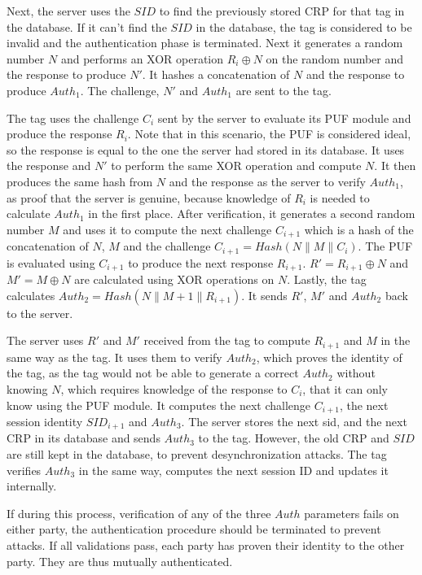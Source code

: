 Next, the server uses the $SID$ to find the previously stored \ac{CRP} for that tag in the database.
If it can't find the $SID$ in the database, the tag is considered to be invalid and the authentication phase is
terminated.
Next it generates a random number $N$ and performs an XOR operation $R_i \oplus N$ on the random number and the response
to produce $N'$. It hashes a concatenation of $N$ and the response to produce $Auth_1$.
The challenge, $N'$ and $Auth_1$ are sent to the tag. \cite[][p. 7]{Zhu2019}

The tag uses the challenge $C_i$ sent by the server to evaluate its PUF module and produce
the response $R_i$. Note that in this scenario, the PUF is considered ideal, so the response is equal to the one the
server had stored in its database.
It uses the response and $N'$ to perform the same XOR operation and compute $N$.
It then produces the same hash from $N$ and the response as the server to verify $Auth_1$, as proof that
the server is genuine, because knowledge of $R_i$ is needed to calculate $Auth_1$ in the first place.
After verification, it generates a second random number $M$ and uses it to compute the next challenge $C_{i+1}$
which is a hash of the concatenation of $N$, $M$ and the challenge $C_{i+1}=Hash(N\parallel M \parallel C_i)$.
The PUF is evaluated using $C_{i+1}$ to produce the next response $R_{i+1}$.
$R'=R_{i+1} \oplus N$ and $M' = M \oplus N$ are calculated using XOR operations on $N$.
Lastly, the tag calculates $Auth_2 = Hash(N \parallel M+1 \parallel R_{i+1})$.
It sends $R'$, $M'$ and $Auth_2$ back to the server. \cite[][p. 7]{Zhu2019}

The server uses $R'$ and $M'$ received from the tag to compute $R_{i+1}$ and $M$ in the same way as the tag.
It uses them to verify $Auth_2$, which proves the identity of the tag, as the tag would not be able to generate
a correct $Auth_2$ without knowing $N$, which requires knowledge of the response to $C_i$,
that it can only know using the PUF module.
It computes the next challenge $C_{i+1}$, the next session identity $SID_{i+1}$ and $Auth_3$.
The server stores the next sid, and the next \ac{CRP} in its database and sends $Auth_3$ to the tag.
However, the old CRP and $SID$ are still kept in the database, to prevent desynchronization attacks.
The tag verifies $Auth_3$ in the same way, computes the next session ID and updates it internally. \cite[][p. 7]{Zhu2019}

If during this process, verification of any of the three $Auth$ parameters fails on either party,
the authentication procedure should be terminated to prevent attacks. If all validations pass,
each party has proven their identity to the other party. They are thus mutually authenticated. \cite[][p. 7]{Zhu2019}

